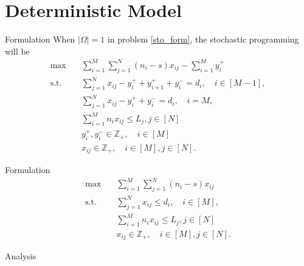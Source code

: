 
\section{Deterministic Model}

    \frame{\sectionpage}

    \begin{frame}{Formulation}
      When $|\Omega| =1$ in problem \eqref{sto_form}, the stochastic programming will be 
      \small
      \begin{equation}\label{one_form}
        \begin{aligned}
        \max \quad & \sum_{i=1}^{M}  \sum_{j= 1}^{N} (n_i-s) x_{ij} - \sum_{i=1}^{M} y_{i}^{+}  \\
        \text {s.t.} \quad & \sum_{j= 1}^{N} x_{ij} - y_{i}^{+}+ y_{i+1}^{+} + y_{i}^{-} = d_{i}, \quad i \in [M-1], \\
        & \sum_{j= 1}^{N} x_{ij} -y_{i}^{+} + y_{i}^{-} = d_{i}, \quad i = M, \\
        & \sum_{i=1}^{M} n_{i} x_{ij} \leq L_j, j \in [N]\\
        & y_{i}^{+}, y_{i}^{-} \in \mathbb{Z}_{+}, \quad i \in [M] \\
        & x_{ij} \in \mathbb{Z}_{+}, \quad i \in [M], j \in [N].
        \end{aligned}
      \end{equation}
    \end{frame}

    \begin{frame}{Formulation}
      \begin{equation}\label{deter_upper}
        \begin{aligned}
        \max \quad & \sum_{i=1}^{M}  \sum_{j= 1}^{N} (n_i- s) x_{ij} \\
        \text {s.t.} \quad & \sum_{j= 1}^{N} x_{ij} \leq d_{i}, \quad i \in [M], \\
        & \sum_{i=1}^{M} n_{i} x_{ij} \leq L_j, j \in [N] \\
        & x_{ij} \in \mathbb{Z}_{+}, \quad i \in [M], j \in [N].
        \end{aligned}
      \end{equation}
    \end{frame}

    \begin{frame}{Analysis}

    \end{frame}


